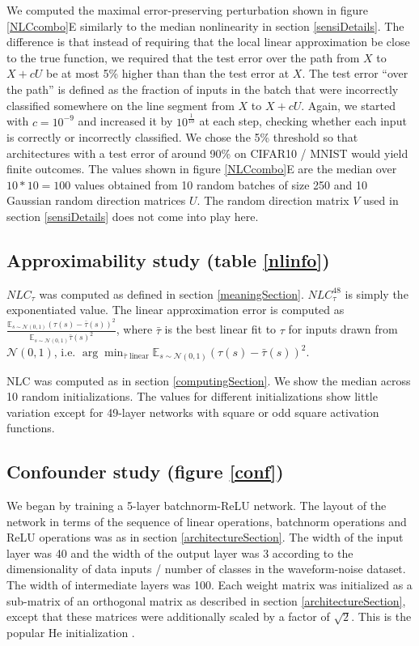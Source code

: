 \documentclass{article} %
\begin{document}
We computed the maximal error-preserving perturbation shown in figure \ref{NLCcombo}E similarly to the median nonlinearity in section \ref{sensiDetails}. The difference is that instead of requiring that the local linear approximation be close to the true function, we required that the test error over the path from $X$ to $X + cU$ be at most 5\% higher than than the test error at $X$. The test error ``over the path'' is defined as the fraction of inputs in the batch that were incorrectly classified somewhere on the line segment from $X$ to $X + cU$. Again, we started with $c=10^{-9}$ and increased it by $10^{\frac{1}{10}}$ at each step, checking whether each input is correctly or incorrectly classified. We chose the 5\% threshold so that architectures with a test error of around 90\% on CIFAR10 / MNIST would yield finite outcomes. The values shown in figure \ref{NLCcombo}E are the median over $10*10=100$ values obtained from 10 random batches of size 250 and 10 Gaussian random direction matrices $U$. The random direction matrix $V$ used in section \ref{sensiDetails} does not come into play here.

\subsection{Approximability study (table \ref{nlinfo})} \label{approximabilityDetails}

$NLC_\tau$ was computed as defined in section \ref{meaningSection}. $NLC_\tau^{48}$ is simply the exponentiated value. The linear approximation error is computed as $\frac{\mathbb{E}_{s \sim \mathcal{N}(0,1)}(\tau(s)-\bar{\tau}(s))^2}{\mathbb{E}_{s \sim \mathcal{N}(0,1)}\bar{\tau}(s)^2}$, where $\bar{\tau}$ is the best linear fit to $\tau$ for inputs drawn from $\mathcal{N}(0,1)$, i.e. $\arg \min_{\bar{\tau} \text{ linear}} \mathbb{E}_{s \sim \mathcal{N}(0,1)}(\tau(s)-\bar{\tau}(s))^2$. 

NLC was computed as in section \ref{computingSection}. We show the median across 10 random initializations. The values for different initializations show little variation except for 49-layer networks with square or odd square activation functions.

\subsection{Confounder study (figure \ref{conf})} \label{confDetails}

We began by training a 5-layer batchnorm-ReLU network. The layout of the network in terms of the sequence of linear operations, batchnorm operations and ReLU operations was as in section \ref{architectureSection}. The width of the input layer was 40 and the width of the output layer was 3 according to the dimensionality of data inputs / number of classes in the waveform-noise dataset. The width of intermediate layers was 100. Each weight matrix was initialized as a sub-matrix of an orthogonal matrix as described in section \ref{architectureSection}, except that these matrices were additionally scaled by a factor of $\sqrt{2}$. This is the popular He initialization \citep{heInit}. 
\end{document}
